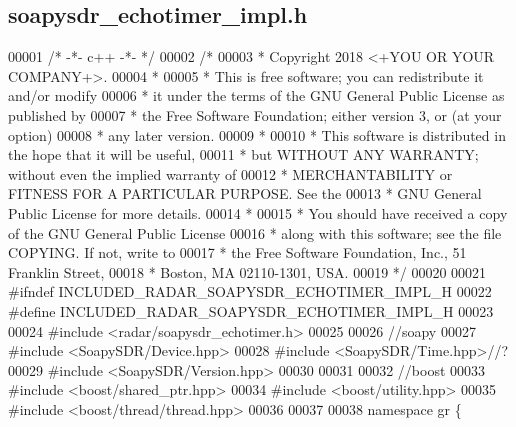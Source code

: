 \subsection{soapysdr\+\_\+echotimer\+\_\+impl.\+h}
\label{soapysdr__echotimer__impl_8h_source}

\begin{DoxyCode}
00001 \textcolor{comment}{/* -*- c++ -*- */}
00002 \textcolor{comment}{/*}
00003 \textcolor{comment}{* Copyright 2018 <+YOU OR YOUR COMPANY+>.}
00004 \textcolor{comment}{*}
00005 \textcolor{comment}{* This is free software; you can redistribute it and/or modify}
00006 \textcolor{comment}{* it under the terms of the GNU General Public License as published by}
00007 \textcolor{comment}{* the Free Software Foundation; either version 3, or (at your option)}
00008 \textcolor{comment}{* any later version.}
00009 \textcolor{comment}{*}
00010 \textcolor{comment}{* This software is distributed in the hope that it will be useful,}
00011 \textcolor{comment}{* but WITHOUT ANY WARRANTY; without even the implied warranty of}
00012 \textcolor{comment}{* MERCHANTABILITY or FITNESS FOR A PARTICULAR PURPOSE.  See the}
00013 \textcolor{comment}{* GNU General Public License for more details.}
00014 \textcolor{comment}{*}
00015 \textcolor{comment}{* You should have received a copy of the GNU General Public License}
00016 \textcolor{comment}{* along with this software; see the file COPYING.  If not, write to}
00017 \textcolor{comment}{* the Free Software Foundation, Inc., 51 Franklin Street,}
00018 \textcolor{comment}{* Boston, MA 02110-1301, USA.}
00019 \textcolor{comment}{*/}
00020 
00021 \textcolor{preprocessor}{#ifndef INCLUDED\_RADAR\_SOAPYSDR\_ECHOTIMER\_IMPL\_H}
00022 \textcolor{preprocessor}{#define INCLUDED\_RADAR\_SOAPYSDR\_ECHOTIMER\_IMPL\_H}
00023 
00024 \textcolor{preprocessor}{#include <radar/soapysdr_echotimer.h>}
00025 
00026 \textcolor{comment}{//soapy}
00027 \textcolor{preprocessor}{#include <SoapySDR/Device.hpp>}
00028 \textcolor{preprocessor}{#include <SoapySDR/Time.hpp>}\textcolor{comment}{//?}
00029 \textcolor{preprocessor}{#include <SoapySDR/Version.hpp>}
00030 
00031 
00032 \textcolor{comment}{//boost}
00033 \textcolor{preprocessor}{#include <boost/shared\_ptr.hpp>}
00034 \textcolor{preprocessor}{#include <boost/utility.hpp>}
00035 \textcolor{preprocessor}{#include <boost/thread/thread.hpp>}
00036 
00037 
00038 \textcolor{keyword}{namespace }gr \{

\end{DoxyCode}

